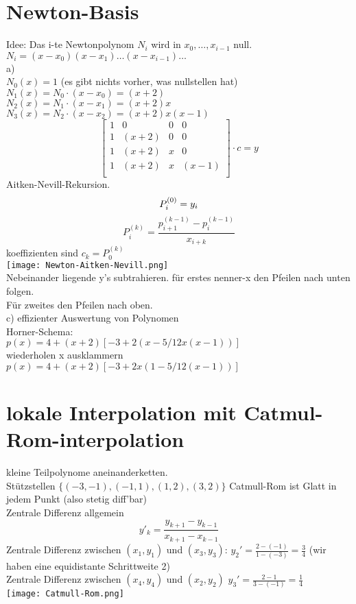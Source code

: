 \documentclass{article}
\begin{document}
	\section{Newton-Basis}
	Idee: Das i-te Newtonpolynom $N_i$ wird in $x_0,\dots, x_{i-1}$ null.\\
	$N_i = (x-x_0)(x-x_1)\dots (x-x_{i-1})\dots$\\
	a)\\
	$N_0(x)=1$ (es gibt nichts vorher, was nullstellen hat)\\
	$N_1(x)=N_0\cdot (x-x_0) = (x+2)$\\
	$N_2(x)=N_1\cdot (x-x_1) = (x+2)x$\\
	$N_3(x)=N_2\cdot (x-x_2) = (x+2)x(x-1)$\\
	$$\begin{bmatrix}
	1&0&0&0\\
	1&(x+2)&0&0\\
	1&(x+2)&x&0\\
	1&(x+2)&x&(x-1)\\
	\end{bmatrix}\cdot c=y
	$$
	Aitken-Nevill-Rekursion.\\
	\begin{equation}
	P^{(0)}_i = y_i\\
	\end{equation}
	\begin{equation}
	P_i^{(k)}=\frac{p^{(k-1)}_{i+1}-p^{(k-1)}_{i}}{x_{i+k}}
	\end{equation}
	koeffizienten sind $c_k=P_0^{(k)}$\\
	\texttt{[image: Newton-Aitken-Nevill.png]}\\
	Nebeinander liegende y's subtrahieren. für erstes nenner-x den Pfeilen nach unten folgen.\\
	Für zweites den Pfeilen nach oben.\\
	c) effizienter Auswertung von Polynomen\\
	Horner-Schema:\\
	$p(x)=4+(x+2)[-3 +2(x-5/12 x(x-1))]$\\
	wiederholen x ausklammern\\
	$p(x)=4+(x+2)[-3 +2x(1-5/12(x-1))]$\\
	\section{lokale Interpolation mit Catmul-Rom-interpolation}
	kleine Teilpolynome aneinanderketten.\\
	Stützstellen $\{(-3,-1),(-1,1),(1,2),(3,2)\}$
	Catmull-Rom ist Glatt in jedem Punkt (also stetig diff'bar)\\
	Zentrale Differenz allgemein
	\[y'_k=\frac{y_{k+1}-y_{k-1}}{x_{k+1}-x_{k-1}}\]
	Zentrale Differenz zwischen $(x_1,y_1)$ und $(x_3,y_3)$: $y_2'=\frac{2-(-1)}{1-(-3)}=\frac{3}{4}$ (wir haben eine equidistante Schrittweite 2)\\
	Zentrale Differenz zwischen $(x_4,y_4)$ und $(x_2,y_2)$ $y_3' = \frac{2-1}{3-(-1)} = \frac{1}{4}$\\
	\texttt{[image: Catmull-Rom.png]}
\end{document}

